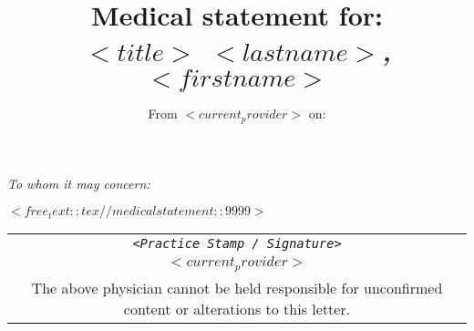 \documentclass[11pt,english]{article}
\begin{document}

\title {Medical statement for: \\ \emph {$<title>$ $<lastname>$, $<firstname>$}}
\author {From $<current_provider>$ on:}
\maketitle 

\noindent
\emph {To whom it may concern:}

$<free_text::tex//medical statement::9999>$

\begin{tabular}{c}
\rule{0pt}{10ex} \texttt {\textsl {\footnotesize <Practice Stamp / Signature>}}\\
\rule{0pt}{4ex} {\footnotesize $<current_provider>$}\\
\hline
\tiny The above physician cannot be held responsible for unconfirmed content or alterations to this letter. \\
\end{tabular}
\end{document}
